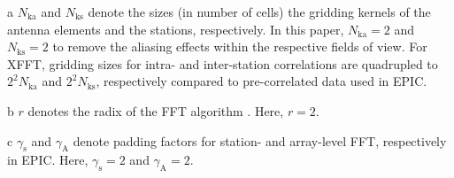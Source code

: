 \documentclass[
  journal=pasa,
  manuscript=article-type,
  year=2020,
  volume=37,
]{cup-journal}
\begin{document}
\begin{table}[htb!]
\begin{threeparttable}
\begin{tabular}{cccccc}
\bottomrule
\end{tabular}
\begin{tablenotes}[hang]
\item[a]$N_\textrm{ka}$ and $N_\textrm{ks}$ denote the sizes (in number of cells) the gridding kernels of the antenna elements and the stations, respectively. In this paper, $N_\textrm{ka}=2$ and $N_\textrm{ks}=2$ to remove the aliasing effects within the respective fields of view. For XFFT, gridding sizes for intra- and inter-station correlations are quadrupled to $2^2 N_\textrm{ka}$ and $2^2 N_\textrm{ks}$, respectively compared to pre-correlated data used in EPIC. 
\item[b]$r$ denotes the radix of the FFT algorithm \citep{Cooley+Tukey1965}. Here, $r=2$. 
\item[c]$\gamma_\textrm{s}$ and $\gamma_\textrm{A}$ denote padding factors for station- and array-level FFT, respectively in EPIC. Here, $\gamma_\textrm{s}=2$ and $\gamma_\textrm{A}=2$.
\end{tablenotes}
\end{threeparttable}
\end{table}
\end{document}
